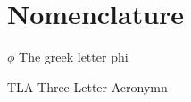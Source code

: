 \chapter{Nomenclature}

\newlength{\gnat}

\begin{Nomencl}[\gnat]

		\item[$\phi$]		The greek letter phi
		
		\item[TLA]			Three Letter Acronymn
\end{Nomencl}
\endinput
